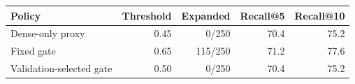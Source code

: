 \begin{tabular}{lrrrr}
\toprule
Policy & Threshold & Expanded & Recall@5 & Recall@10 \\
\midrule
Dense-only proxy & 0.45 & 0/250 & 70.4 & 75.2 \\
Fixed gate & 0.65 & 115/250 & 71.2 & 77.6 \\
Validation-selected gate & 0.50 & 0/250 & 70.4 & 75.2 \\
\bottomrule
\end{tabular}
